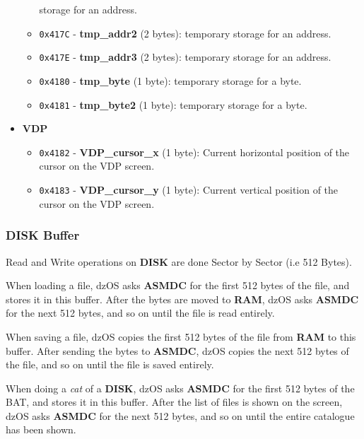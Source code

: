 \documentclass[a4paper,11pt]{article}
\begin{document}
\begin{itemize}
\begin{itemize}
            storage for an address.
            \item \texttt{0x417C} - \textbf{tmp\_addr2} (2 bytes): temporary
            storage for an address.
            \item \texttt{0x417E} - \textbf{tmp\_addr3} (2 bytes): temporary
            storage for an address.
            \item \texttt{0x4180} - \textbf{tmp\_byte} (1 byte):  temporary
            storage for a byte.
            \item \texttt{0x4181} - \textbf{tmp\_byte2} (1 byte):  temporary
            storage for a byte.
        \end{itemize}
        \item \textbf{VDP}
        \begin{itemize}
            \item \texttt{0x4182} - \textbf{VDP\_cursor\_x} (1 byte):  Current
            horizontal position of the cursor on the VDP screen.
            \item \texttt{0x4183} - \textbf{VDP\_cursor\_y} (1 byte):  Current
            vertical position of the cursor on the VDP screen.
        \end{itemize}
    \end{itemize}

    \subsubsection{DISK Buffer}

    Read and Write operations on \textbf{DISK} are done Sector by Sector (i.e 
    512 Bytes).

    When loading a file, dzOS asks \textbf{ASMDC} for the first 512 bytes of the
    file, and stores it in this buffer. After the bytes are moved to
    \textbf{RAM}, dzOS asks \textbf{ASMDC} for the next 512 bytes, and so on
    until the file is read entirely.

    When saving a file, dzOS copies the first 512 bytes of the file from
    \textbf{RAM} to this buffer. After sending the bytes to \textbf{ASMDC}, dzOS
    copies the next 512 bytes of the file, and so on until the file is saved
    entirely.

    When doing a \textit{cat} of a \textbf{DISK}, dzOS asks \textbf{ASMDC} for
    the first 512 bytes of the BAT, and stores it in this buffer. After the list
    of files is shown on the screen, dzOS asks \textbf{ASMDC} for the next 512
    bytes, and so on until the entire catalogue has been shown.
\end{document}
